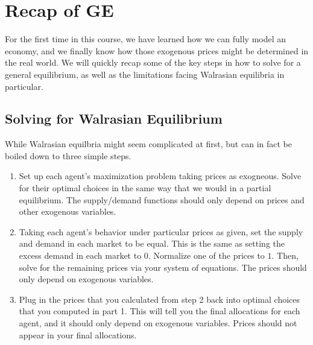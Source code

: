 \section{Recap of GE}
For the first time in this course, we have learned how we can fully model an economy, and we finally know how those exogenous prices might be determined in the real world. We will quickly recap some of the key steps in how to solve for a general equilibrium, as well as the limitations facing Walrasian equilibria in particular.

\subsection*{Solving for Walrasian Equilibrium}
While Walrasian equilbria might seem complicated at first, but can in fact be boiled down to three simple steps. 
\begin{enumerate}
    \item Set up each agent's maximization problem taking prices as exogneous. Solve for their optimal choices in the same way that we would in a partial equilibrium. The supply/demand functions should only depend on prices and other exogenous variables. 
    \item Taking each agent's behavior under particular prices as given, set the supply and demand in each market to be equal. This is the same as setting the excess demand in each market to 0. Normalize one of the prices to $1$. Then, solve for the remaining prices via your system of equations. The prices should only depend on exogenous variables.
    \item Plug in the prices that you calculated from step 2 back into optimal choices that you computed in part 1. This will tell you the final allocations for each agent, and it should only depend on exogenous variables. Prices should not appear in your final allocations.
\end{enumerate}

